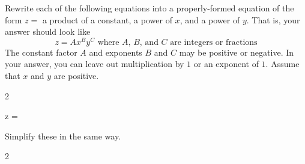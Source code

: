 \newpage

Rewrite each of the following equations into a properly-formed equation of the form $z = $ a product of a constant, a power of $x$, and a power of $y$.
That is, your answer should look like
\begin{equation*}
 z = A x^B y^C \text{ where $A$, $B$, and $C$ are integers or fractions}
\end{equation*}
The constant factor $A$ and exponents $B$ and $C$ may be positive or negative.
In your answer, you can leave out multiplication by $1$ or an exponent of $1$.
Assume that $x$ and $y$ are positive.

\begin{multicols}{2}
 \begin{ProblemSet}[pencil space=2in]

  \begin{Problem}
   \Large
   \begin{LeftEquation}
    z = 
   \end{LeftEquation}
  \end{Problem}

 \end{ProblemSet}
\end{multicols}

\newpage
{}

Simplify these in the same way.

\begin{multicols}{2}
 \begin{ProblemSet}[pencil space=0in]

 \end{ProblemSet}
\end{multicols}

